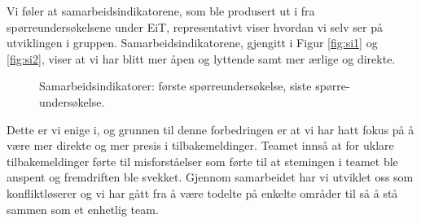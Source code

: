 Vi føler at samarbeidsindikatorene, som ble produsert ut i fra spørreundersøkelsene under EiT, representativt
viser hvordan vi selv ser på utviklingen i gruppen. Samarbeidsindikatorene, gjengitt i Figur \ref{fig:si1} og \ref{fig:si2}, viser 
at vi har blitt mer åpen og lyttende samt mer ærlige og direkte. 
\begin{figure}[H] \centering
{}
\caption{Samarbeidsindikatorer: \protect{\ref{fig:si1}} første spørreundersøkelse, \protect{\ref{fig:si2}} siste spørre{-}undersøkelse.}
\end{figure}
Dette er vi enige i, og grunnen til denne forbedringen er at vi har hatt fokus på å være mer direkte og mer presis i tilbakemeldinger.
Teamet innså at for uklare tilbakemeldinger førte til misforståelser som førte til at stemingen i teamet ble anspent og fremdriften ble
svekket. Gjennom samarbeidet har vi utviklet oss som konfliktløserer og vi har gått fra å være todelte på enkelte områder
til så å stå sammen som et enhetlig team.